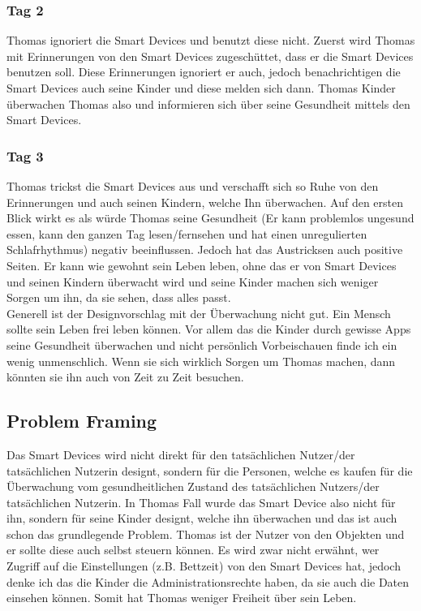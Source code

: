 \subsubsection{\textbf{Tag 2}} 
Thomas ignoriert die Smart Devices und benutzt diese nicht. Zuerst wird Thomas mit Erinnerungen von den Smart Devices zugeschüttet, dass er die Smart Devices benutzen soll. Diese Erinnerungen ignoriert er auch, jedoch benachrichtigen die Smart Devices auch seine Kinder und diese melden sich dann. Thomas Kinder überwachen Thomas also und informieren sich über seine Gesundheit mittels den Smart Devices.
\subsubsection{\textbf{Tag 3}} 
Thomas trickst die Smart Devices aus und verschafft sich so Ruhe von den Erinnerungen und auch seinen Kindern, welche Ihn überwachen. Auf den ersten Blick wirkt es als würde Thomas seine Gesundheit (Er kann problemlos ungesund essen, kann den ganzen Tag lesen/fernsehen und hat einen unregulierten Schlafrhythmus) negativ beeinflussen. Jedoch hat das Austricksen auch positive Seiten. Er kann wie gewohnt sein Leben leben, ohne das er von Smart Devices und seinen Kindern überwacht wird und seine Kinder machen sich weniger Sorgen um ihn, da sie sehen, dass alles passt. \\
Generell ist der Designvorschlag mit der Überwachung nicht gut. Ein Mensch sollte sein Leben frei leben können. Vor allem das die Kinder durch gewisse Apps seine Gesundheit überwachen und nicht persönlich Vorbeischauen finde ich ein wenig unmenschlich. Wenn sie sich wirklich Sorgen um Thomas machen, dann könnten sie ihn auch von Zeit zu Zeit besuchen. \\
\subsection{Problem Framing}
Das Smart Devices wird nicht direkt für den tatsächlichen Nutzer/der tatsächlichen Nutzerin designt, sondern für die Personen, welche es kaufen für die Überwachung vom gesundheitlichen Zustand des tatsächlichen Nutzers/der tatsächlichen Nutzerin. In Thomas Fall wurde das Smart Device also nicht für ihn, sondern für seine Kinder designt, welche ihn überwachen und das ist auch schon das grundlegende Problem. Thomas ist der Nutzer von den Objekten und er sollte diese auch selbst steuern können. Es wird zwar nicht erwähnt, wer Zugriff auf die Einstellungen (z.B. Bettzeit) von den Smart Devices hat, jedoch denke ich das die Kinder die Administrationsrechte haben, da sie auch die Daten einsehen können. Somit hat Thomas weniger Freiheit über sein Leben.

